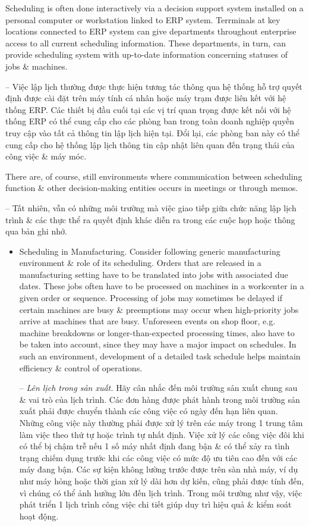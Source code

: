 \documentclass{article}
\begin{document}
\begin{itemize}
\begin{itemize}
        Scheduling is often done interactively via a decision support system installed on a personal computer or workstation linked to ERP system. Terrminals at key locations connected to ERP system can give departments throughout enterprise access to all current scheduling information. These departments, in turn, can provide scheduling system with up-to-date information concerning statuses of jobs \& machines.

        -- Việc lập lịch thường được thực hiện tương tác thông qua hệ thống hỗ trợ quyết định được cài đặt trên máy tính cá nhân hoặc máy trạm được liên kết với hệ thống ERP. Các thiết bị đầu cuối tại các vị trí quan trọng được kết nối với hệ thống ERP có thể cung cấp cho các phòng ban trong toàn doanh nghiệp quyền truy cập vào tất cả thông tin lập lịch hiện tại. Đổi lại, các phòng ban này có thể cung cấp cho hệ thống lập lịch thông tin cập nhật liên quan đến trạng thái của công việc \& máy móc.

        There are, of course, still environments where communication between scheduling function \& other decision-making entities occurs in meetings or through memos.

        -- Tất nhiên, vẫn có những môi trường mà việc giao tiếp giữa chức năng lập lịch trình \& các thực thể ra quyết định khác diễn ra trong các cuộc họp hoặc thông qua bản ghi nhớ.
        \begin{itemize}
            \item {\sf Scheduling in Manufacturing.} Consider following generic manufacturing environment \& role of its scheduling. Orders that are released in a manufacturing setting have to be translated into jobs with associated due dates. These jobs often have to be processed on machines in a workcenter in a given order or sequence. Processing of jobs may sometimes be delayed if certain machines are busy \& preemptions may occur when high-priority jobs arrive at machines that are busy. Unforeseen events on shop floor, e.g. machine breakdowns or longer-than-expected processing times, also have to be taken into account, since they may have a major impact on schedules. In such an environment, development of a detailed task schedule helps maintain efficiency \& control of operations.

            -- {\it Lên lịch trong sản xuất.} Hãy cân nhắc đến môi trường sản xuất chung sau \& vai trò của lịch trình. Các đơn hàng được phát hành trong môi trường sản xuất phải được chuyển thành các công việc có ngày đến hạn liên quan. Những công việc này thường phải được xử lý trên các máy trong 1 trung tâm làm việc theo thứ tự hoặc trình tự nhất định. Việc xử lý các công việc đôi khi có thể bị chậm trễ nếu 1 số máy nhất định đang bận \& có thể xảy ra tình trạng chiếm dụng trước khi các công việc có mức độ ưu tiên cao đến với các máy đang bận. Các sự kiện không lường trước được trên sàn nhà máy, ví dụ như máy hỏng hoặc thời gian xử lý dài hơn dự kiến, cũng phải được tính đến, vì chúng có thể ảnh hưởng lớn đến lịch trình. Trong môi trường như vậy, việc phát triển 1 lịch trình công việc chi tiết giúp duy trì hiệu quả \& kiểm soát hoạt động.


\end{itemize}
\end{itemize}
\end{itemize}
\end{document}

